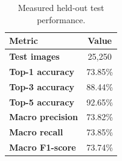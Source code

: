 \begin{table}[t]
\centering
\caption{Measured held-out test performance.}
\label{tbl:testperf}
\begin{tabular}{lc}
\toprule
Metric & Value \\
\midrule
\textbf{Test images} & 25,250 \\
\textbf{Top-1 accuracy} & 73.85\% \\
\textbf{Top-3 accuracy} & 88.44\% \\
\textbf{Top-5 accuracy} & 92.65\% \\
\textbf{Macro precision} & 73.82\% \\
\textbf{Macro recall} & 73.85\% \\
\textbf{Macro F1-score} & 73.74\% \\
\bottomrule
\end{tabular}
\end{table}
